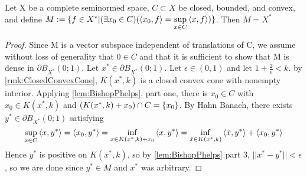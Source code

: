 \begin{thm}
    
    
    Let X be a complete seminormed space, 
    $C \subset X$ be closed, bounded, and convex, 
    and define $M:=\{f \in X^*| (\exists x_0 \in C)(\left\langle x_0,f \right\rangle=\sup\limits_{x \in C}\left\langle x,f \right\rangle)\}$.
    Then $\overline{M}=X^*$
    \begin{proof}
        Since M is a vector subspace independent of translations of C, we assume without loss of generality that $0 \in C$ and that it is sufficient to show that M is dense in $\partial B_{X^*}(0;1)$. 
        Let $x^* \in \partial B_{X^*}(0;1)$.
        Let $\epsilon \in (0,1)$ and let $1+\frac{2}{\epsilon} < k$. by \ref{rmk:ClosedConvexCone}, $K(x^*,k)$ is a closed convex cone with nonempty interior. Applying \ref{lem:BishopPhelps}, part one, there is $x_0 \in C$ with $x_0 \in K(x^*,k)$ and $\left( K(x^*,k)+x_0\right) \cap C = \{x_0\}$. 
        By Hahn Banach, there exists $y^* \in \partial B_{X^*}(0;1)$ satisfying
        \begin{equation}
            \sup\limits_{x \in C} \left\langle x,y^* \right\rangle = \left\langle x_0,y^* \right\rangle = \inf\limits_{x \in K(x^*,k)+x_0} \left\langle x,y^* \right\rangle = \inf\limits_{\tilde{x} \in K(x^*,k)} \left\langle \tilde{x},y^* \right\rangle+ \left\langle x_0,y^* \right\rangle
        \end{equation}
        Hence $y^*$ is positive on $K(x^*,k)$, so by \ref{lem:BishopPhelps} part 3, $||x^*-y^*||< \epsilon$, so we are done since $y^* \in M$ and $x^*$ was arbitrary. 
    \end{proof} 
\end{thm}
